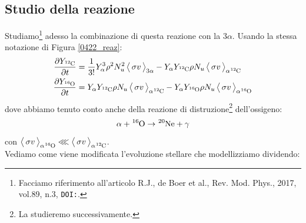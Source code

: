 \subsection{Studio della reazione} Studiamo\footnote{Facciamo riferimento all'articolo R.J., de Boer et al., Rev. Mod. Phys., 2017, vol.89, n.3, \texttt{DOI:}.} adesso la combinazione di questa reazione con la $3\alpha$. Usando la stessa notazione di Figura \ref{0422_reaz}:
\begin{align*}
	\tderpar{Y_{\ce{^{12}C}}} &= \frac{1}{3!} Y_{\alpha}^3 \rho^2 N_u^2 \, \mean{\sigma v}_{3\alpha} - Y_\alpha Y_{\ce{^{12}C}} \rho N_u \, \mean{\sigma v}_{\alpha\ce{^{12}C}} \\
	\tderpar{Y_{\ce{^{16}O}}} &= Y_\alpha Y_{\ce{^{12}C}} \rho N_u \, \mean{\sigma v}_{\alpha\ce{^{12}C}} - Y_\alpha Y_{\ce{^{16}O}} \rho N_u \, \mean{\sigma v}_{\alpha\ce{^{16}O}}	
\end{align*}
dove abbiamo tenuto conto anche della reazione di distruzione\footnote{La studieremo successivamente.} dell'ossigeno:
$$\alpha + \ce{^{16}O} \to \ce{^{20}Ne} + \gamma$$
con $\mean{\sigma v}_{\alpha \ce{^{16}O}}\lll \mean{\sigma v}_{\alpha \ce{^{12}C}}$.\\ 
Vediamo come viene modificata l'evoluzione stellare che modellizziamo dividendo:
